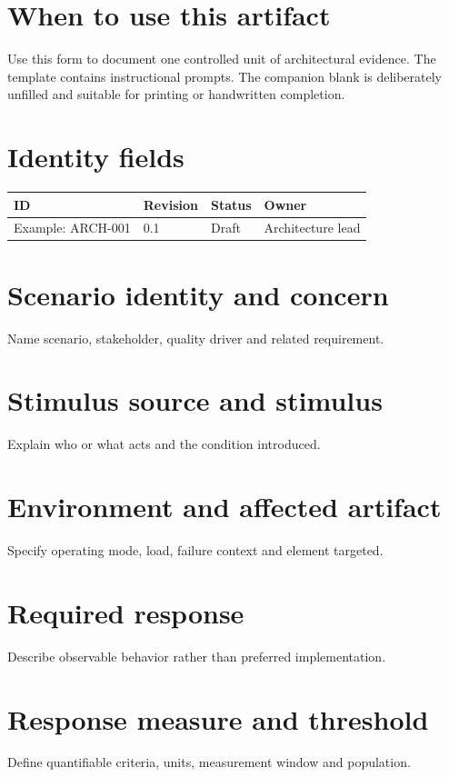 \documentclass[10pt,letterpaper]{article}
\begin{document}
\DocProvenance
\section{When to use this artifact}
Use this form to document one controlled unit of architectural evidence. The template contains instructional prompts. The companion blank is deliberately unfilled and suitable for printing or handwritten completion.

\section{Identity fields}
\small
\begin{tabularx}{\linewidth}{@{}YYYY@{}}
\toprule
\textbf{ID} & \textbf{Revision} & \textbf{Status} & \textbf{Owner} \\
\midrule
Example: ARCH-001 & 0.1 & Draft & Architecture lead \\
\bottomrule
\end{tabularx}
\normalsize
\section{Scenario identity and concern}
Name scenario, stakeholder, quality driver and related requirement.

\section{Stimulus source and stimulus}
Explain who or what acts and the condition introduced.

\section{Environment and affected artifact}
Specify operating mode, load, failure context and element targeted.

\section{Required response}
Describe observable behavior rather than preferred implementation.

\section{Response measure and threshold}
Define quantifiable criteria, units, measurement window and population.
\end{document}
